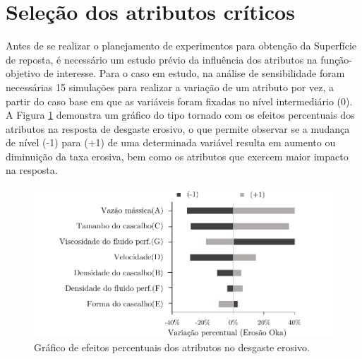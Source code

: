 \section{Seleção dos atributos críticos}
\label{sec:Seleçãodosatributoscríticos} 

Antes de se realizar o planejamento de experimentos para obtenção da Superfície de reposta, é necessário um estudo prévio da influência dos atributos na função-objetivo de interesse. Para o caso em estudo, na análise de sensibilidade foram necessárias 15 simulações para realizar a variação de um atributo por vez, a partir do caso base em que as variáveis foram fixadas no nível intermediário (0). A Figura \ref{fig:efeitossensi} demonstra um gráfico do tipo tornado com os efeitos percentuais dos atributos na resposta de desgaste erosivo, o que permite observar se a mudança de nível (-1)
para (+1) de uma determinada variável resulta em aumento ou diminuição da taxa
erosiva, bem como os atributos que exercem maior impacto na resposta. 

\begin{figure}[H] 
    \centering  
    \includegraphics{Figuras/analisesensi.pdf}  
    \caption{Gráfico de efeitos percentuais dos atributos no desgaste erosivo.}  
    \label{fig:efeitossensi}  
\end{figure}

